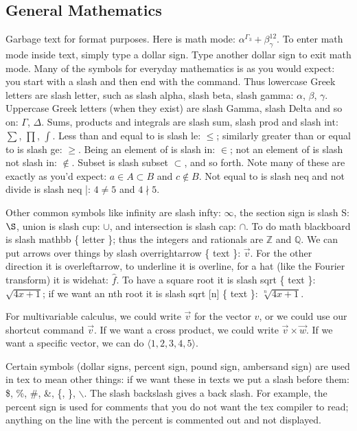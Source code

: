 \documentclass[12pt,reqno]{amsart}
\newcommand{\arr}[1]{\overrightarrow{#1}}
\newcommand{\avec}[1]{\langle #1 \rangle}
\numberwithin{equation}{section}
\begin{document}
\subsection{General Mathematics}

Garbage text for format purposes. Here is math mode:
$\alpha^{\Gamma_3} + \beta^{12}_\gamma$. To enter math mode inside
text, simply type a dollar sign. Type another dollar sign to exit
math mode. Many of the symbols for everyday mathematics is as you
would expect: you start with a slash and then end with the
command. Thus lowercase Greek letters are slash letter, such as
slash alpha, slash beta, slash gamma: $\alpha$, $\beta$, $\gamma$.
Uppercase Greek letters (when they exist) are slash Gamma, slash
Delta and so on: $\Gamma$, $\Delta$. Sums, products and integrals
are slash sum, slash prod and slash int: $\sum$, $\prod$, $\int$.
Less than and equal to is slash le: $\le$; similarly greater than
or equal to is slash ge: $\ge$. Being an element of is slash in:
$\in$; not an element of is slash not slash in: $\not\in$. Subset
is slash subset $\subset$, and so forth. Note many of these are
exactly as you'd expect: $a \in A \subset B$ and $c \not\in B$.
Not equal to is slash neq and not divide is slash neq |: $4 \neq
5$ and $4 \nmid 5$.

Other common symbols like infinity are slash infty: $\infty$, the
section sign is slash S: $\S$, union is slash cup: $\cup$, and
intersection is slash cap: $\cap$. To do math blackboard is slash
mathbb \{ letter \}; thus the integers and rationals are
$\mathbb{Z}$ and $\mathbb{Q}$. We can put arrows over things by
slash overrightarrow \{ text \}: $\overrightarrow{v}$. For the
other direction it is overleftarrow, to underline it is overline,
for a hat (like the Fourier transform) it is widehat:
$\widehat{f}$. To have a square root it is slash sqrt \{ text \}:
$\sqrt{4x+1}$; if we want an nth root it is slash sqrt [n] \{ text
\}: $\sqrt[n]{4x+1}$.

For multivariable calculus, we could write $\overrightarrow{v}$ for the vector $v$, or we could use our shortcut command $\arr{v}$. If we want a cross product, we could write $\arr{v} \times \arr{w}$. If we want a specific vector, we can do $\avec{1,2,3,4,5}$.

Certain symbols (dollar signs, percent sign, pound sign, ambersand
sign) are used in tex to mean other things: if we want these in
texts we put a slash before them: \$, \%, \#, \&, \{, \},
$\backslash$. The slash backslash gives a back slash. For example,
the percent sign is used for comments that you do not want the tex
compiler to read; anything on the line with the
percent is commented out and not displayed. %
\end{document}
